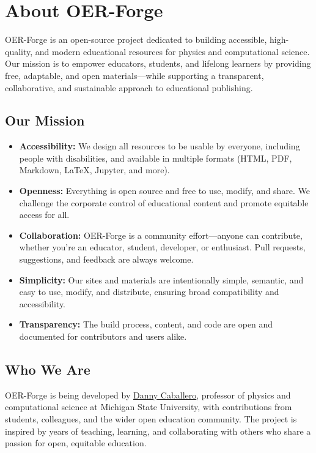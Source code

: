 \section{About OER-Forge}\label{about-oer-forge}

OER-Forge is an open-source project dedicated to building accessible,
high-quality, and modern educational resources for physics and
computational science. Our mission is to empower educators, students,
and lifelong learners by providing free, adaptable, and open
materials---while supporting a transparent, collaborative, and
sustainable approach to educational publishing.

\subsection{Our Mission}\label{our-mission}

\begin{itemize}
\tightlist
\item
  \textbf{Accessibility:} We design all resources to be usable by
  everyone, including people with disabilities, and available in
  multiple formats (HTML, PDF, Markdown, LaTeX, Jupyter, and more).
\item
  \textbf{Openness:} Everything is open source and free to use, modify,
  and share. We challenge the corporate control of educational content
  and promote equitable access for all.
\item
  \textbf{Collaboration:} OER-Forge is a community effort---anyone can
  contribute, whether you're an educator, student, developer, or
  enthusiast. Pull requests, suggestions, and feedback are always
  welcome.
\item
  \textbf{Simplicity:} Our sites and materials are intentionally simple,
  semantic, and easy to use, modify, and distribute, ensuring broad
  compatibility and accessibility.
\item
  \textbf{Transparency:} The build process, content, and code are open
  and documented for contributors and users alike.
\end{itemize}

\subsection{Who We Are}\label{who-we-are}

OER-Forge is being developed by \href{https://dannycab.github.io/}{Danny
Caballero}, professor of physics and computational science at Michigan
State University, with contributions from students, colleagues, and the
wider open education community. The project is inspired by years of
teaching, learning, and collaborating with others who share a passion
for open, equitable education.

